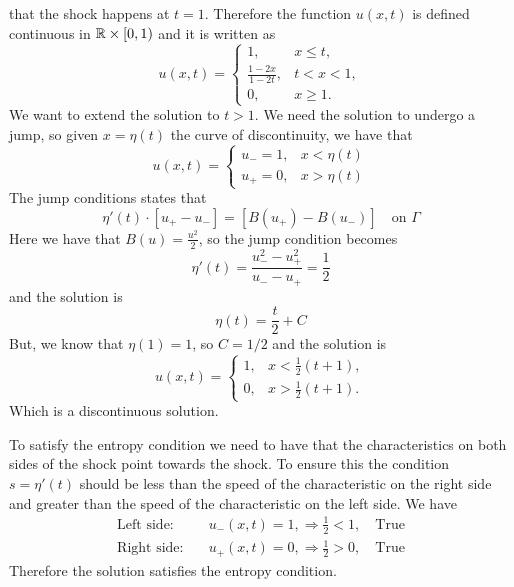 that the shock happens at \(t=1\). 
Therefore the function \(u(x,t)\) is defined continuous in \(\mathbb{R} \times [0, 1)\) and it is written as
\[
    u(x,t) = \begin{cases}
        1, & x \leq t, \\
        \frac{1-2x}{1-2t}, & t < x < 1, \\
        0, & x \geq 1.
    \end{cases}
\]
We want to extend the solution to \(t > 1\). We need the solution to undergo a jump, so given \(x = \eta(t)\) the curve of discontinuity, we have that
\[
    u(x, t) = \begin{cases}
        u_- = 1, & x < \eta(t) \\ 
        u_+ = 0, & x > \eta(t)
    \end{cases}
\]
The jump conditions states that
\[
    \eta'(t) \cdot \left[u_+ - u_-\right] = \left[B(u_+) - B(u_-)\right] \quad \text{on } \Gamma
\]
Here we have that \(B(u) = \frac{u^2}{2}\), so the jump condition becomes
\[
    \eta'(t) = \frac{u_-^2 - u_+^2}{u_- - u_+} = \frac{1}{2}
\]
and the solution is
\[
    \eta(t) = \frac{t}{2} + C
\]
But, we know that \(\eta(1) = 1\), so \(C = 1/2\) and the solution is
\[
    u(x,t) = \begin{cases}
        1, & x < \frac{1}{2}(t+1), \\
        0, & x > \frac{1}{2}(t+1).  
    \end{cases}
\]
Which is a discontinuous solution. 

To satisfy the entropy condition we need to have that the characteristics on both sides of the shock point towards the shock. To ensure this the condition \(s = \eta'(t)\) should be less than the speed of the characteristic on the right side and greater than the speed of the characteristic on the left side. We have
\begin{align*}
    \text{Left side:} & \quad u_-(x,t) = 1, \Rightarrow \frac{1}{2} < 1, \quad \text{True} \\
    \text{Right side:} & \quad u_+(x,t) = 0, \Rightarrow \frac{1}{2} > 0, \quad \text{True} 
\end{align*}
Therefore the solution satisfies the entropy condition.


